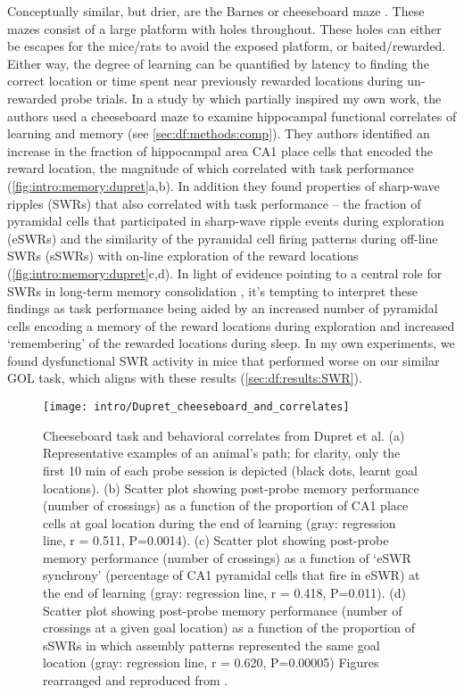 Conceptually similar, but drier, are the Barnes or cheeseboard maze \citep{Barnes1979}\citep{Kesner1991}\citep{Dupret2010a}.
These mazes consist of a large platform with holes throughout.
These holes can either be escapes for the mice/rats to avoid the exposed platform, or baited/rewarded.
Either way, the degree of learning can be quantified by latency to finding the correct location or time spent near previously rewarded locations during un-rewarded probe trials.
In a study by \citeauthor{Dupret2010a} which partially inspired my own work, the authors used a cheeseboard maze to examine hippocampal functional correlates of learning and memory (see \autoref{sec:df:methods:comp}).
They authors identified an increase in the fraction of hippocampal area CA1 place cells that encoded the reward location, the magnitude of which correlated with task performance (\autoref{fig:intro:memory:dupret}a,b).
In addition they found properties of sharp-wave ripples (SWRs) that also correlated with task performance -- the fraction of pyramidal cells that participated in sharp-wave ripple events during exploration (eSWRs) and the similarity of the pyramidal cell firing patterns during off-line SWRs (sSWRs) with on-line exploration of the reward locations (\autoref{fig:intro:memory:dupret}c,d).
In light of evidence pointing to a central role for SWRs in long-term memory consolidation \citep{Buzsaki2015}, it's tempting to interpret these findings as task performance being aided by an increased number of pyramidal cells encoding a memory of the reward locations during exploration and increased `remembering' of the rewarded locations during sleep.
In my own experiments, we found dysfunctional SWR activity in mice that performed worse on our similar \ac{GOL} task, which aligns with these results (\autoref{sec:df:results:SWR}).

\begin{figure}
	\centering
	\texttt{[image: intro/Dupret\_cheeseboard\_and\_correlates]}
	\caption[Cheeseboard task and behavioral correlates from Dupret et al.]{Cheeseboard task and behavioral correlates from Dupret et al.
	(a) Representative examples of an animal's path; for clarity, only the first 10 min of each probe session is depicted (black dots, learnt goal locations).
	(b) Scatter plot showing post-probe memory performance (number of crossings) as a function of the proportion of CA1 place cells at goal location during the end of learning (gray: regression line, r = 0.511, P=0.0014).
	(c) Scatter plot showing post-probe memory performance (number of crossings) as a function of `eSWR synchrony' (percentage of CA1 pyramidal cells that fire in eSWR) at the end of learning (gray: regression line, r = 0.418, P=0.011).
	(d) Scatter plot showing post-probe memory performance (number of crossings at a given goal location) as a function of the proportion of sSWRs in which assembly patterns represented the same goal location (gray: regression line, r = 0.620, P=0.00005)
	Figures rearranged and reproduced from \citet{Dupret2010a}.}
	\label{fig:intro:memory:dupret}
\end{figure}


